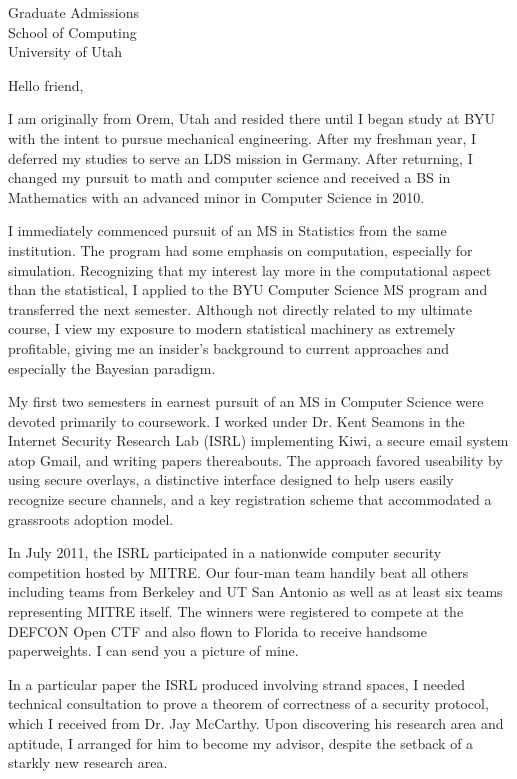 \documentclass{letter}
\begin{document}
\begin{letter}{Graduate Admissions\\ School of Computing\\ University of Utah}
\opening{Hello friend,}

I am originally from Orem, Utah and resided there until I began study at BYU with the intent to pursue mechanical engineering. After my freshman year, I deferred my studies to serve an LDS mission in Germany. After returning, I changed my pursuit to math and computer science and received a BS in Mathematics with an advanced minor in Computer Science in 2010.

I immediately commenced pursuit of an MS in Statistics from the same institution. The program had some emphasis on computation, especially for simulation. Recognizing that my interest lay more in the computational aspect than the statistical, I applied to the BYU Computer Science MS program and transferred the next semester. Although not directly related to my ultimate course, I view my exposure to modern statistical machinery as extremely profitable, giving me an insider's background to current approaches and especially the Bayesian paradigm.

My first two semesters in earnest pursuit of an MS in Computer Science were devoted primarily to coursework. I worked under Dr. Kent Seamons in the Internet Security Research Lab (ISRL) implementing Kiwi, a secure email system atop Gmail, and writing papers thereabouts. The approach favored useability by using secure overlays, a distinctive interface designed to help users easily recognize secure channels, and a key registration scheme that accommodated a grassroots adoption model.

In July 2011, the ISRL participated in a nationwide computer security competition hosted by MITRE. Our four-man team handily beat all others including teams from Berkeley and UT San Antonio as well as at least six teams representing MITRE itself. The winners were registered to compete at the DEFCON Open CTF and also flown to Florida to receive handsome paperweights. I can send you a picture of mine.

In a particular paper the ISRL produced involving strand spaces, I needed technical consultation to prove a theorem of correctness of a security protocol, which I received from Dr. Jay McCarthy. Upon discovering his research area and aptitude, I arranged for him to become my advisor, despite the setback of a starkly new research area.


\end{letter}
\end{document}

